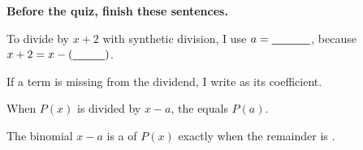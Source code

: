 \vspace{6pt}
\textbf{Before the quiz, finish these sentences.}

To divide by $x+2$ with synthetic division, I use $a=\blank[1.2cm]$, because $x+2=x-(\blank[1cm])$.

If a term is missing from the dividend, I write \blank[1.2cm] as its coefficient.

When $P(x)$ is divided by $x-a$, the \blank[2.4cm] equals $P(a)$.

The binomial $x-a$ is a \blank[2cm] of $P(x)$ exactly when the remainder is \blank[1.2cm].


